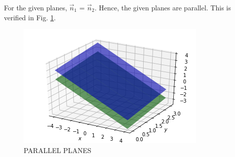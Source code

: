 For the given planes,  $\vec n_1$ = $\vec n_2$. Hence, 
the given planes are parallel.  This is verified in 
Fig. \ref{linforms/43/d/fig:1}.
\begin{figure}[!ht]
\centering
    \includegraphics[width= \columnwidth]{solutions/su2021/2/43/d/figure4.png}
    \caption{PARALLEL PLANES} \label{linforms/43/d/fig:1}
\end{figure}
